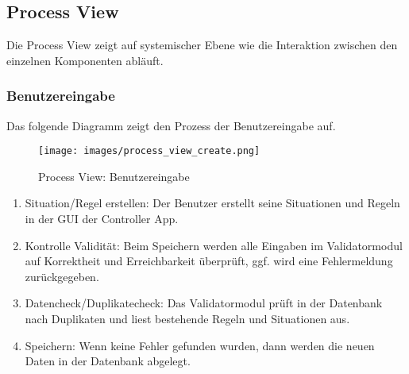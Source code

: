 \subsection{Process View}
%
Die Process View zeigt auf systemischer Ebene wie die Interaktion zwischen den einzelnen Komponenten abläuft.
%
\subsubsection{Benutzereingabe}
Das folgende Diagramm zeigt den Prozess der Benutzereingabe auf.
\begin{figure}[ht]
  \begin{center}
    \texttt{[image: images/process\_view\_create.png]}
    \caption[Process View]{Process View: Benutzereingabe}
    \label{fig:process_view_create}
  \end{center}
\end{figure}
%
\begin{enumerate}
\item Situation/Regel erstellen: Der Benutzer erstellt seine Situationen und Regeln in der GUI der Controller App.
\item Kontrolle Validität: Beim Speichern werden alle Eingaben im Validatormodul auf Korrektheit und Erreichbarkeit überprüft, ggf. wird eine Fehlermeldung zurückgegeben.
\item Datencheck/Duplikatecheck: Das Validatormodul prüft in der Datenbank nach Duplikaten und liest bestehende Regeln und Situationen aus.
\item Speichern: Wenn keine Fehler gefunden wurden, dann werden die neuen Daten in der Datenbank abgelegt.
\end{enumerate}
%
\clearpage

